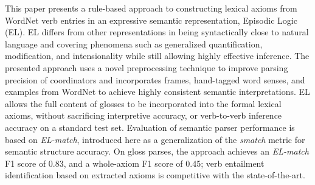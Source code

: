 This paper presents a rule-based approach to constructing lexical axioms from WordNet verb entries in an expressive semantic representation, Episodic Logic (EL). EL differs from other representations in being syntactically close to natural language and covering phenomena such as generalized quantification, modification, and intensionality while still allowing highly effective inference. The presented approach uses a novel preprocessing technique to improve parsing precision of coordinators and incorporates frames, hand-tagged word senses, and examples from WordNet to achieve highly consistent semantic interpretations. EL allows the full content of glosses to be incorporated into the formal lexical axioms, without sacrificing interpretive accuracy, or verb-to-verb inference accuracy on a standard test set. Evaluation of semantic parser performance is based on \textit{EL-match}, introduced here as a generalization of the \textit{smatch} metric for semantic structure accuracy. On gloss  parses, the approach achieves an \textit{EL-match} F1 score of 0.83, and a whole-axiom F1 score of 0.45; verb entailment identification based on extracted axioms is competitive with the state-of-the-art.
